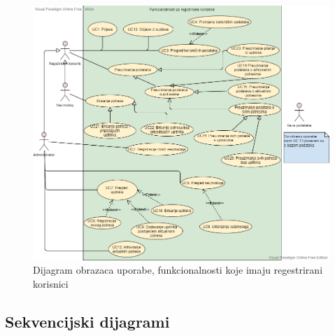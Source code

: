 				  \begin{figure}[H]
					\includegraphics[width=\textwidth]{slike/druginovi.PNG} 
					\caption{Dijagram obrazaca uporabe, funkcionalnosti koje imaju regestrirani korisnici}
					\label{fig:obrasci2} 
				   \end{figure}
				\eject		
				
			\subsection{Sekvencijski dijagrami}
				
